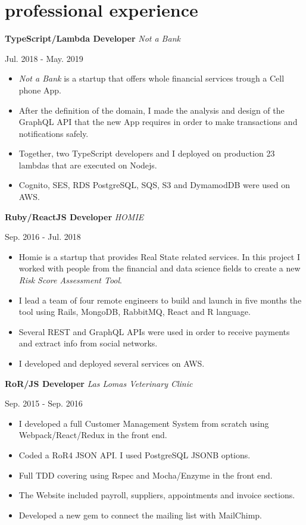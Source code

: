 \documentclass[]{k-cv}
\begin{document}
\newpage

\section{professional experience}

  \textbf{TypeScript/Lambda Developer}  \textit{Not a Bank}
  {\color{gray} {\small Jul. 2018 - May. 2019 \par}}
  \begin{itemize}
    \item \textit{Not a Bank} is a startup that offers whole financial services trough a Cell phone App.
    \item After the definition of the domain, I made the analysis and design of the GraphQL API that the new App
          requires in order to make transactions and notifications safely.
    \item Together, two TypeScript developers and I deployed on production 23 lambdas that are executed on Nodejs.
    \item Cognito, SES, RDS PostgreSQL, SQS, S3 and DymamodDB were used on AWS.
  \end{itemize}

  \textbf{Ruby/ReactJS Developer}  \textit{HOMIE}
  {\color{gray} {\small Sep. 2016 - Jul. 2018 \par}}
  \begin{itemize}
    \item Homie is a startup that provides Real State related services. In this project I
          worked with people from the financial and data science fields to create a new
          \textit{Risk Score Assessment Tool}.
    \item I lead a team of four remote engineers to build and launch in five months the tool
          using Rails, MongoDB, RabbitMQ, React and R language.
    \item Several REST and GraphQL APIs were used in order to receive payments and extract info from social networks.
    \item I developed and deployed several services on AWS.
  \end{itemize}

   \textbf{RoR/JS Developer} \textit{Las Lomas Veterinary Clinic}
   {\color{gray} {\small Sep. 2015 - Sep. 2016 \par}}
   \begin{itemize}
     \item I developed a full Customer Management System from scratch using Webpack/React/Redux in the front end.
     \item Coded a RoR4 JSON API. I used PostgreSQL JSONB options.
     \item Full TDD covering using Rspec and Mocha/Enzyme in the front end.
     \item The Website included payroll, suppliers, appointments and invoice sections.
     \item Developed a new gem to connect the mailing list with MailChimp.
   \end{itemize}
\end{document}
